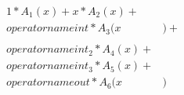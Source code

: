 \documentclass[preview]{standalone}
\begin{document}
\begin{align*}
1*A_1(x) +x*A_2(x) +\\operatorname{int}*A_3(x&) + \\ \\operatorname{int}_2*A_4(x) + \\operatorname{int}_3*A_5(x) + \\operatorname{out}*A_6(x&)
\end{align*}
\end{document}
